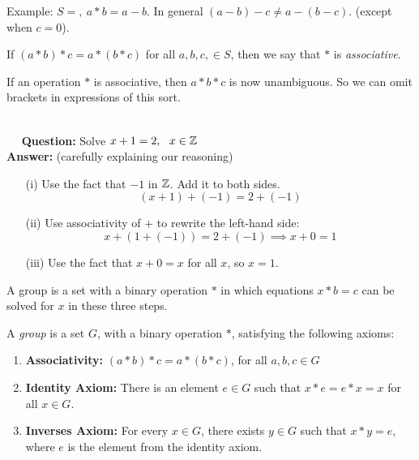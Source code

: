 \documentclass[twoside]{scrartcl}
\begin{document}
 Example: $S = ,~ a*b =  a-b$. In general $(a-b)-c \neq a - (b-c)$. (except when $c = 0$).\\



\begin{definition} If $(a*b)*c = a*(b*c)$ for all $a,b,c, \in S$, then we say that $*$ is \emph{associative}.	
\end{definition}\vspace*{10pt}


If an operation $*$ is associative, then $a*b*c$ is now unambiguous. So we can omit brackets in expressions of this sort.\\


\begin{example} \\
 ~~ \textbf{Question:} Solve $x + 1 = 2, ~~ x \in \mathbb{Z}$\\
 
\textbf{Answer:} (carefully explaining our reasoning) \begin{enumerate}
 \item[(i)] Use the fact that $-1$ in $\mathbb{Z}$. Add it to both sides.
 \[(x+1) + (-1) =  2 + (-1)\]
 \item[(ii)] Use associativity of $+$ to rewrite the left-hand side:
 \[x + (1 + (-1)) = 2 + (-1) \implies x + 0 = 1\]
 \item[(iii)] Use the fact that $x + 0 = x$ for all $x$, so $x = 1$.
 \end{enumerate}
 \end{example}

A group is a set with a binary operation $*$ in which equations $x * b = c$ can be solved for $x$ in these three steps.\\

\begin{definition} A \emph{group} is a set $G$, with a binary operation $*$, satisfying the following axioms:\begin{enumerate}
\item \textbf{Associativity:} $(a*b)*c = a*(b*c)$, for all $a,b,c \in G$
\item \textbf{Identity Axiom:} There is an element $e \in G$ such that $x * e = e*x = x$ for all $x \in G$.
\item \textbf{Inverses Axiom:} For every $x \in G$, there exists $y \in G$ such that $x * y = e$, where $e$ is the element from the identity axiom.
\end{enumerate}
\end{definition}
\end{document}
